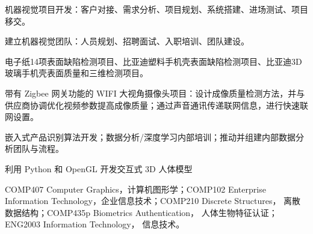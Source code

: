 \documentclass[]{deedy-resume-openfont}
\begin{document}

\descript{| }
\begin{tightemize}
\item 机器视觉项目开发：客户对接、需求分析、项目规划、系统搭建、进场测试、项目移交。
\item 建立机器视觉团队：人员规划、招聘面试、入职培训、团队建设。
\item 电子纸14项表面缺陷检测项目、比亚迪塑料手机壳表面缺陷检测项目、比亚迪3D玻璃手机壳表面质量和三维检测项目。
\end{tightemize}
\sectionsep

\begin{tightemize}
\item 带有 Zigbee 网关功能的 WIFI 大视角摄像头项目：设计成像质量检测方法，并与供应商协调优化视频参数提高成像质量；通过声音通讯传递联网信息，进行快速联网设置。
\item 嵌入式产品识别算法开发；数据分析/深度学习内部培训；推动并组建内部数据分析团队与流程。
\end{tightemize}
\sectionsep

\begin{tightemize}
\item 利用 Python 和 OpenGL 开发交互式 3D 人体模型
\end{tightemize}
\sectionsep

\begin{tightemize}
\item COMP407 Computer Graphics，计算机图形学；COMP102 Enterprise Information Technology，企业信息技术；COMP210 Discrete Structures， 离散数据结构；COMP435p Biometrics Authentication， 人体生物特征认证；ENG2003 Information Technology， 信息技术。
\end{tightemize}
\sectionsep
\end{document}
